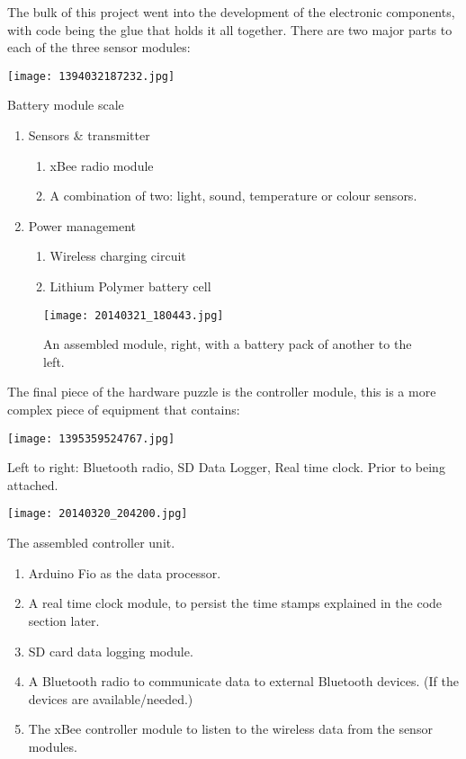 The bulk of this project went into the development of the electronic components, with code being the glue that holds it all together. There are two major parts to each of the three sensor modules: 
\begin{marginfigure}
  \texttt{[image: 1394032187232.jpg]}
  \caption{Battery module scale}
  \label{fig:batterypack}
\end{marginfigure}
\begin{enumerate}
  \item Sensors \& transmitter
  \begin{enumerate}
    \item xBee radio module
    \item A combination of two: light, sound, temperature or colour sensors.
  \end{enumerate} 
  \item Power management
  \begin{enumerate}
    \item Wireless charging circuit
    \item Lithium Polymer battery cell
  \end{enumerate}
\end{enumerate}
\begin{figure*}
  \texttt{[image: 20140321\_180443.jpg]}
  \caption{An assembled module, right, with a battery pack of another to the left.}
  \label{fig:assembledmodule}
\end{figure*}
\FloatBarrier
\newpage

The final piece of the hardware puzzle is the controller module, this is a more complex piece of equipment that contains:
\begin{marginfigure}
  \texttt{[image: 1395359524767.jpg]}
  \caption{Left to right: Bluetooth radio, SD Data Logger, Real time clock. Prior to being attached.}
  \label{fig:controllerparts}
\end{marginfigure}
\begin{marginfigure}
  \texttt{[image: 20140320\_204200.jpg]}
  \caption{The assembled controller unit.}
  \label{fig:controller}
\end{marginfigure}
\begin{enumerate}
	\item Arduino Fio as the data processor.
	\item A real time clock module, to persist the time stamps explained in the code section later.
	\item SD card data logging module.
	\item A Bluetooth radio to communicate data to external Bluetooth devices. (If the devices are available/needed.)
	\item The xBee controller module to listen to the wireless data from the sensor modules.
\end{enumerate} 


